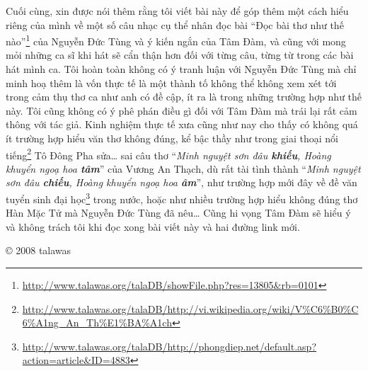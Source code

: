 \documentclass[../main.tex]{subfiles}
\begin{document}
\begin{multicols}{2}
Cuối cùng, xin được nói thêm rằng tôi viết bài này để góp thêm một cách hiểu riêng của mình về một số câu nhạc cụ thể nhân đọc bài “Đọc bài thơ như thế nào”\footnote{\url{http://www.talawas.org/talaDB/showFile.php?res=13805&rb=0101}} của Nguyễn Đức Tùng và ý kiến ngắn của Tâm Đàm, và cũng với mong mỏi những ca sĩ khi hát sẽ cẩn thận hơn đối với từng câu, từng từ trong các bài hát mình ca. Tôi hoàn toàn không có ý tranh luận với Nguyễn Đức Tùng mà chỉ minh hoạ thêm là vốn thực tế là một thành tố không thể không xem xét tới trong cảm thụ thơ ca như anh có đề cập, ít ra là trong những trường hợp như thế này. Tôi cũng không có ý phê phán điều gì đối với Tâm Đàm mà trái lại rất cảm thông với tác giả. Kinh nghiệm thực tế xưa cũng như nay cho thấy có không quá ít trường hợp hiểu văn thơ không đúng, kể bậc thầy như trong giai thoại nổi tiếng\footnote{\url{http://www.talawas.org/talaDB/http://vi.wikipedia.org/wiki/V%C6%B0%C6%A1ng_An_Th%E1%BA%A1ch}} Tô Đông Pha sửa… sai câu thơ “\textit{Minh nguyệt sơn đâu \textbf{khiếu}, Hoàng khuyển ngoạ hoa \textbf{tâm}}” của Vương An Thạch, dù rất tài tình thành “\textit{Minh nguyệt sơn đâu \textbf{chiếu}, Hoàng khuyển ngoạ hoa \textbf{âm}}”, như trường hợp mới đây về đề văn tuyển sinh đại học\footnote{\url{http://www.talawas.org/talaDB/http://phongdiep.net/default.asp?action=article&ID=4883}} trong nước, hoặc như nhiều trường hợp hiểu không đúng thơ Hàn Mặc Tử mà Nguyễn Đức Tùng đã nêu… Cũng hi vọng Tâm Đàm sẽ hiểu ý và không trách tôi khi đọc xong bài viết này và hai đường link mới. 
 
© 2008 talawas 
\end{multicols}
\end{document}
